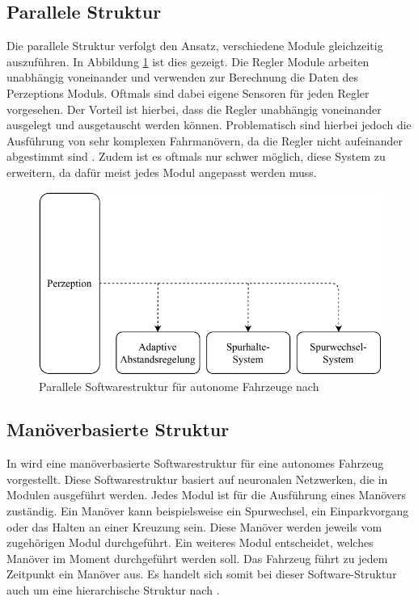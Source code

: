\subsection{Parallele Struktur}
Die parallele Struktur verfolgt den Ansatz, verschiedene Module gleichzeitig auszuführen. In Abbildung \ref{par:str} ist dies gezeigt. Die Regler Module arbeiten unabhängig voneinander und verwenden zur Berechnung die Daten des Perzeptions Moduls. Oftmals sind dabei eigene Sensoren für jeden Regler vorgesehen. Der Vorteil ist hierbei, dass die Regler unabhängig voneinander ausgelegt und ausgetauscht werden können. Problematisch sind hierbei jedoch die Ausführung von sehr komplexen Fahrmanövern, da die Regler nicht aufeinander abgestimmt sind \cite{JUN14}. Zudem ist es oftmals nur schwer möglich, diese System zu erweitern, da dafür meist jedes Modul angepasst werden muss.
\FloatBarrier
\begin{figure}[t]
  \centering
  \includegraphics[width=\textwidth]{images/stand_der_technik/parallele_struktur.pdf}
  \caption[Parallele Softwarestruktur für autonome Fahrzeuge]{Parallele Softwarestruktur für autonome Fahrzeuge nach \cite{JUN14}}
  \label{par:str}
\end{figure}
\FloatBarrier

\subsection{Manöverbasierte Struktur}
In \cite{DUA20} wird eine manöverbasierte Softwarestruktur für eine autonomes Fahrzeug vorgestellt. Diese Softwarestruktur basiert auf neuronalen Netzwerken, die in Modulen ausgeführt werden. Jedes Modul ist für die Ausführung eines Manövers zuständig. Ein Manöver kann beispielsweise ein Spurwechsel, ein Einparkvorgang oder das Halten an einer Kreuzung sein. Diese Manöver werden jeweils vom zugehörigen Modul durchgeführt. Ein weiteres Modul entscheidet, welches Manöver im Moment durchgeführt werden soll. Das Fahrzeug führt zu jedem Zeitpunkt ein Manöver aus. Es handelt sich somit bei dieser Software-Struktur auch um eine hierarchische Struktur nach \cite{JUN14}.

